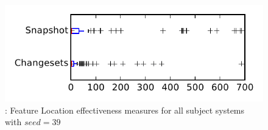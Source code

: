 
\begin{figure}
\centering
\includegraphics[height=0.4\textheight]{figures/flt_seed/rq1_tiny_39}
\caption{\rone: Feature Location effectiveness measures for all subject systems with $seed=39$}
\label{fig:flt_seed:rq1:tiny}
\end{figure}
